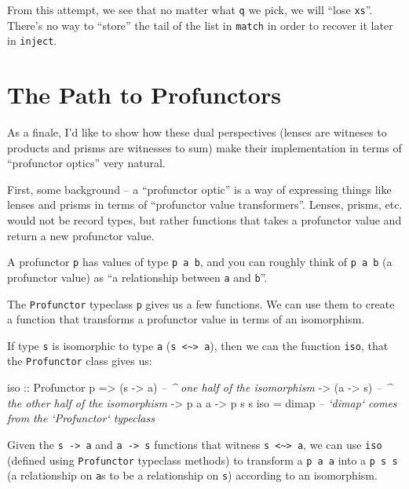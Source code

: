\documentclass[]{article}
\newenvironment{Shaded}{}{}
\newcommand{\CommentTok}[1]{\textcolor[rgb]{0.38,0.63,0.69}{\textit{#1}}}
\newcommand{\DataTypeTok}[1]{\textcolor[rgb]{0.56,0.13,0.00}{#1}}
\newcommand{\FunctionTok}[1]{\textcolor[rgb]{0.02,0.16,0.49}{#1}}
\newcommand{\NormalTok}[1]{#1}
\newcommand{\OtherTok}[1]{\textcolor[rgb]{0.00,0.44,0.13}{#1}}
\begin{document}
From this attempt, we see that no matter what \texttt{q} we pick, we will ``lose
\texttt{xs}''. There's no way to ``store'' the tail of the list in
\texttt{match} in order to recover it later in \texttt{inject}.

\hypertarget{the-path-to-profunctors}{%
\section{The Path to Profunctors}\label{the-path-to-profunctors}}

As a finale, I'd like to show how these dual perspectives (lenses are witneses
to products and prisms are witnesses to sum) make their implementation in terms
of ``profunctor optics'' very natural.

First, some background -- a ``profunctor optic'' is a way of expressing things
like lenses and prisms in terms of ``profunctor value transformers''. Lenses,
prisms, etc. would not be record types, but rather functions that takes a
profunctor value and return a new profunctor value.

A profunctor \texttt{p} has values of type \texttt{p\ a\ b}, and you can roughly
think of \texttt{p\ a\ b} (a profunctor value) as ``a relationship between
\texttt{a} and \texttt{b}''.

The \texttt{Profunctor} typeclass \texttt{p} gives us a few functions. We can
use them to create a function that transforms a profunctor value in terms of an
isomorphism.

If type \texttt{s} is isomorphic to type \texttt{a}
(\texttt{s\ \textless{}\textasciitilde{}\textgreater{}\ a}), then we can the
function \texttt{iso}, that the \texttt{Profunctor} class gives us:

\begin{Shaded}
\begin{Highlighting}[]
\OtherTok{iso ::} \DataTypeTok{Profunctor}\NormalTok{ p}
    \OtherTok{=>}\NormalTok{ (s }\OtherTok{->}\NormalTok{ a)         }\CommentTok{-- ^ one half of the isomorphism}
    \OtherTok{->}\NormalTok{ (a }\OtherTok{->}\NormalTok{ s)         }\CommentTok{-- ^ the other half of the isomorphism}
    \OtherTok{->}\NormalTok{ p a a}
    \OtherTok{->}\NormalTok{ p s s}
\NormalTok{iso }\FunctionTok{=}\NormalTok{ dimap         }\CommentTok{-- `dimap` comes from the `Profunctor` typeclass}
\end{Highlighting}
\end{Shaded}

Given the \texttt{s\ -\textgreater{}\ a} and \texttt{a\ -\textgreater{}\ s}
functions that witness
\texttt{s\ \textless{}\textasciitilde{}\textgreater{}\ a}, we can use
\texttt{iso} (defined using \texttt{Profunctor} typeclass methods) to transform
a \texttt{p\ a\ a} into a \texttt{p\ s\ s} (a relationship on \texttt{a}s to be
a relationship on \texttt{s}) according to an isomorphism.
\end{document}
